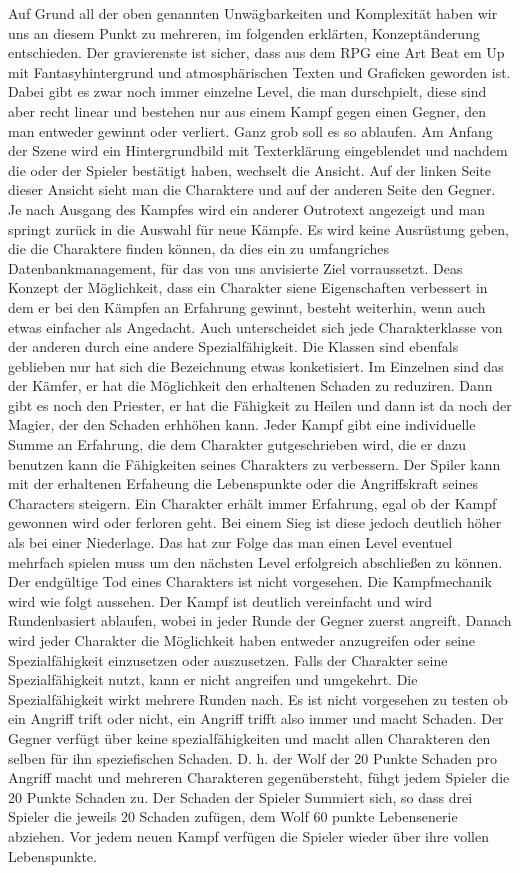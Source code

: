 Auf Grund all der oben genannten Unwägbarkeiten und Komplexität haben wir uns an diesem Punkt zu mehreren, im folgenden erklärten, Konzeptänderung entschieden. 
Der gravierenste ist sicher, dass aus dem RPG eine Art Beat em Up mit Fantasyhintergrund und atmosphärischen Texten und Graficken geworden ist. Dabei gibt es zwar noch immer einzelne Level, die man durschpielt, diese sind aber recht linear und bestehen nur aus einem Kampf gegen einen Gegner, den man entweder gewinnt oder verliert. Ganz grob soll es so ablaufen. Am Anfang der Szene wird ein Hintergrundbild mit Texterklärung eingeblendet und nachdem die oder der Spieler bestätigt haben, wechselt die Ansicht. Auf der linken Seite dieser Ansicht sieht man die Charaktere und auf der anderen Seite den Gegner. Je nach Ausgang des Kampfes wird ein anderer Outrotext angezeigt und man springt zurück in die Auswahl für neue Kämpfe. Es wird keine Ausrüstung geben, die die Charaktere finden können, da dies ein zu umfangriches Datenbankmanagement, für das von uns anvisierte Ziel vorraussetzt. Deas Konzept der Möglichkeit, dass ein Charakter siene Eigenschaften verbessert in dem er bei den Kämpfen an Erfahrung gewinnt, besteht weiterhin, wenn auch etwas einfacher als Angedacht. Auch unterscheidet sich jede Charakterklasse von der anderen durch eine andere Spezialfähigkeit. Die Klassen sind ebenfals geblieben nur hat sich die Bezeichnung etwas konketisiert. Im Einzelnen sind das der Kämfer, er hat die Möglichkeit den erhaltenen Schaden zu reduziren. Dann gibt es noch den Priester, er hat die Fähigkeit zu Heilen und dann ist da noch der Magier, der den Schaden erhhöhen kann. Jeder Kampf gibt eine individuelle Summe an Erfahrung, die dem Charakter gutgeschrieben wird, die er dazu benutzen kann die Fähigkeiten seines Charakters zu verbessern. Der Spiler kann mit der erhaltenen Erfaheung die Lebenspunkte oder die Angriffskraft seines Characters steigern. Ein Charakter erhält immer Erfahrung, egal ob der Kampf gewonnen wird oder ferloren geht. Bei einem Sieg ist diese jedoch deutlich höher als bei einer Niederlage. Das hat zur Folge das man einen Level eventuel mehrfach spielen muss um den nächsten Level erfolgreich abschließen zu können. Der endgültige Tod eines Charakters ist nicht vorgesehen. Die Kampfmechanik wird wie folgt aussehen. Der Kampf ist deutlich vereinfacht und wird Rundenbasiert ablaufen, wobei in jeder Runde der Gegner zuerst angreift. Danach wird jeder Charakter die Möglichkeit haben entweder anzugreifen oder seine Spezialfähigkeit einzusetzen oder auszusetzen. Falls der Charakter seine Spezialfähigkeit nutzt, kann er nicht angreifen und umgekehrt. Die Spezialfähigkeit wirkt mehrere Runden nach. Es ist nicht vorgesehen zu testen ob ein Angriff trift oder nicht, ein Angriff trifft also immer und macht Schaden. Der Gegner verfügt über keine spezialfähigkeiten und macht allen Charakteren den selben für ihn speziefischen Schaden. D. h. der Wolf der 20 Punkte Schaden pro Angriff macht und mehreren Charakteren gegenübersteht, fühgt jedem Spieler die 20 Punkte Schaden zu. Der Schaden der Spieler Summiert sich, so dass drei Spieler die jeweils 20 Schaden zufügen, dem Wolf 60 punkte Lebensenerie abziehen. Vor jedem neuen Kampf verfügen die Spieler wieder über ihre vollen Lebenspunkte. 
